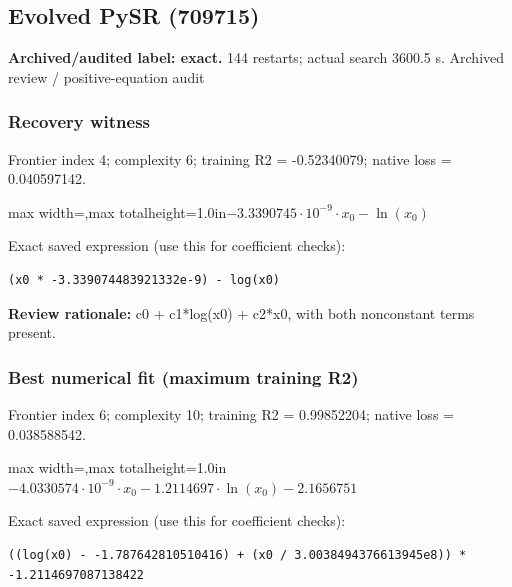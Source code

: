 \documentclass[10pt,letterpaper,landscape]{article}
\begin{document}
\begin{minipage}[t]{0.485\textwidth}
\subsection*{Evolved PySR (709715)}
\textbf{Archived/audited label: exact.} 144 restarts; actual search 3600.5 s.
{\small Archived review / positive-equation audit}
\subsubsection*{Recovery witness}
Frontier index 4; complexity 6; training R2 = -0.52340079; native loss = 0.040597142.
\begin{center}\begin{adjustbox}{max width=\linewidth,max totalheight=1.0in}$\displaystyle - 3.3390745 \cdot 10^{-9} \cdot x_{0} - \ln{\left(x_{0} \right)}$\end{adjustbox}\end{center}
{\scriptsize Exact saved expression (use this for coefficient checks):}
\begin{lstlisting}
(x0 * -3.339074483921332e-9) - log(x0)
\end{lstlisting}
{\small\textbf{Review rationale:} c0 + c1*log(x0) + c2*x0, with both nonconstant terms present.}
\subsubsection*{Best numerical fit (maximum training R2)}
Frontier index 6; complexity 10; training R2 = 0.99852204; native loss = 0.038588542.
\begin{center}\begin{adjustbox}{max width=\linewidth,max totalheight=1.0in}$\displaystyle - 4.0330574 \cdot 10^{-9} \cdot x_{0} - 1.2114697 \cdot \ln{\left(x_{0} \right)} - 2.1656751$\end{adjustbox}\end{center}
{\scriptsize Exact saved expression (use this for coefficient checks):}
\begin{lstlisting}
((log(x0) - -1.787642810510416) + (x0 / 3.0038494376613945e8)) * -1.2114697087138422
\end{lstlisting}
\end{minipage}
\clearpage{}\label{schechter-10009}
\end{document}
